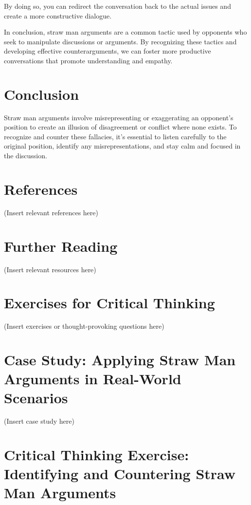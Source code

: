 \documentclass{report}%
\begin{document}
{{{{{{{{{{{{{{By doing so, you can redirect the conversation back to the actual issues and create a more constructive dialogue.

In conclusion, straw man arguments are a common tactic used by opponents who seek to manipulate discussions or arguments. By recognizing these tactics and developing effective counterarguments, we can foster more productive conversations that promote understanding and empathy.

\section*{Conclusion}

Straw man arguments involve misrepresenting or exaggerating an opponent's position to create an illusion of disagreement or conflict where none exists. To recognize and counter these fallacies, it's essential to listen carefully to the original position, identify any misrepresentations, and stay calm and focused in the discussion.

\section*{References}

(Insert relevant references here)

\section*{Further Reading}

(Insert relevant resources here)

\section*{Exercises for Critical Thinking}

(Insert exercises or thought-provoking questions here)

\section*{Case Study: Applying Straw Man Arguments in Real-World Scenarios}

(Insert case study here)

\section*{Critical Thinking Exercise: Identifying and Countering Straw Man Arguments}%
}}}}}}}}}}}}}}
\end{document}
